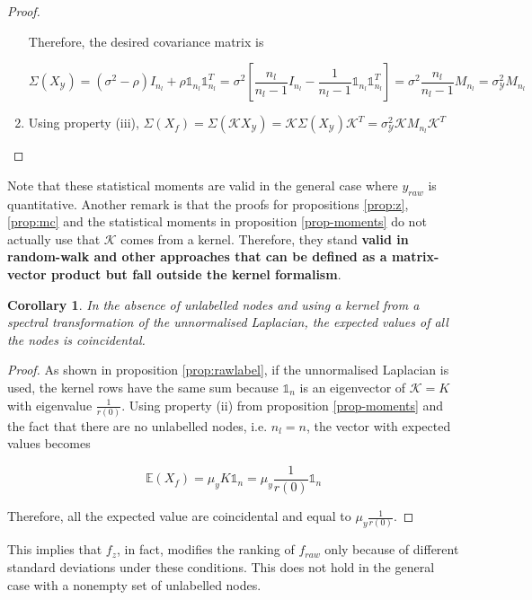 \documentclass[12pt]{article}  %
\newtheorem{corollary}[theorem]{Corollary}
\begin{document}
\begin{proof}
\begin{enumerate}[label=(\roman*)]
Therefore, the desired covariance matrix is

$$ \Sigma(X_{\mathcal{Y}}) = (\sigma^2 - \rho) I_{n_l} + \rho \mathbb{1}_{n_l}\mathbb{1}_{n_l}^T = \sigma^2 \left[ \frac{n_l}{n_l - 1} I_{n_l} - \frac{1}{n_l - 1}\mathbb{1}_{n_l}\mathbb{1}_{n_l}^T \right] = \sigma^2 \frac{n_l}{n_l - 1} M_{n_l} = \sigma_{\mathcal{Y}}^2 M_{n_l}$$


\item Using property (iii), $ \Sigma(X_f) = \Sigma(\mathcal{K}  X_{\mathcal{Y}}) = \mathcal{K} \Sigma(X_{\mathcal{Y}})  \mathcal{K}^T = \sigma_{\mathcal{Y}}^2 \mathcal{K} M_{n_l} \mathcal{K}^T$


\end{enumerate}

\end{proof}

Note that these statistical moments are valid in the general case where $y_{raw}$ is quantitative.  
Another remark is that the proofs for propositions \ref{prop:z}, \ref{prop:mc} and the statistical moments in proposition \ref{prop-moments} do not actually use that $\mathcal{K}$ comes from a kernel. 
Therefore, they stand \textbf{valid in random-walk and other approaches that can be defined as a matrix-vector product but fall outside the kernel formalism}.

\begin{corollary}

In the absence of unlabelled nodes and using a kernel from a spectral transformation of the unnormalised Laplacian, the expected values of all the nodes is coincidental. 

\end{corollary}

\begin{proof}
As shown in proposition \ref{prop:rawlabel}, if the unnormalised Laplacian is used, the kernel rows have the same sum because $\mathbb{1}_n$ is an eigenvector of $\mathcal{K} = K$ with eigenvalue $\frac{1}{r(0)}$. 
Using property (ii) from proposition \ref{prop-moments} and the fact that there are no unlabelled nodes, i.e. $n_l = n$, the vector with expected values becomes

$$ \mathds{E}(X_f) = \mu_y K  \mathbb{1}_n = \mu_y \frac{1}{r(0)} \mathbb{1}_n$$

Therefore, all the expected value are coincidental and equal to $\mu_y \frac{1}{r(0)}$. 

\end{proof}

This implies that $f_z$, in fact, modifies the ranking of $f_{raw}$ only because of different standard deviations under these conditions.
This does not hold in the general case with a nonempty set of unlabelled nodes.
\end{document}
